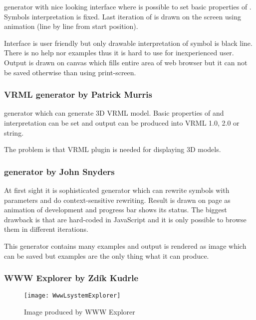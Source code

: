 \noindent
\lsystem generator with nice looking interface where is possible to set basic properties of \lsystem.
Symbols interpretation is fixed.
Last iteration of \lsystem is drawn on the screen using animation (line by line from start position).

Interface is user friendly but only drawable interpretation of symbol is black line.
There is no help nor examples thus it is hard to use for inexperienced user.
Output is drawn on canvas which fills entire area of web browser but it can not be saved otherwise than using print-screen.


\subsubsection{VRML \lsystem generator by Patrick Murris}
  
\noindent
\lsystem generator which can generate 3D VRML model.
Basic properties of \lsystem and interpretation can be set and output can be produced into VRML 1.0, 2.0 or string.

The problem is that VRML plugin is needed for displaying 3D models.



\subsubsection{\lsystem generator by John Snyders}

\noindent
At first sight it is sophisticated \lsystem generator which can rewrite symbols with parameters and do context-sensitive rewriting.
Result is drawn on page as animation of development and progress bar shows its status.
The biggest drawback is that \lsystems are hard-coded in JavaScript and it is only possible to browse them in different iterations.

This \lsystem generator contains many examples and output is rendered as image which can be saved but examples are the only thing what it can produce.


\subsubsection{WWW \lsystem Explorer by Zdík Kudrle}

\begin{wrapfigure}{r}{0.45\textwidth}
	\vspace{-20pt}
	\texttt{[image: WwwLsystemExplorer]}
	\caption{Image produced by WWW \lsystem Explorer}
	\label{fig:lsysExplorer}
\end{wrapfigure}

